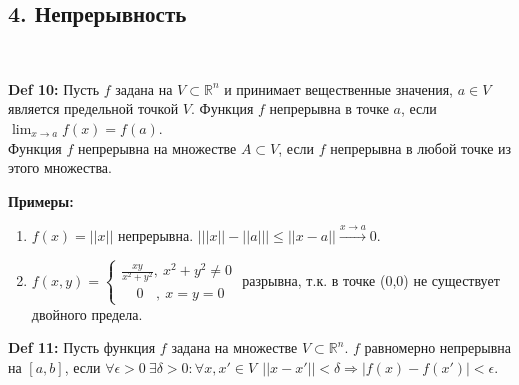 \documentclass[book, 11pt]{report}
\begin{document}
        \subsection*{4. Непрерывность}
        \par{\ }
        \par{\textbf{Def 10: }Пусть $f$ задана на $V\subset\mathbb{R}^n$ и принимает вещественные значения, $a\in V$ является предельной точкой $V$. Функция $f$ непрерывна в точке $a$, если $\displaystyle\lim_{x\to a}f(x)=f(a)$. \\
        Функция $f$ непрерывна на множестве $A\subset V$, если $f$ непрерывна в любой точке из этого множества.
        }
        \vspace{0.4cm}
        \par{\textbf{Примеры:}}
        \begin{enumerate}
            \item \par{$f(x)=||x||$ непрерывна. $\bigg|||x||-||a||\bigg|\leq||x-a||\xrightarrow{x\to a}0$.}
            \item \par{$f(x,y)=\begin{cases}
                \displaystyle\frac{xy}{x^2+y^2}, \ x^2+y^2\ne0 \\
                \ \ \ \ \ 0 \ \ \ \ , \ x=y=0
            \end{cases}$ разрывна, т.к. в точке (0,0) не существует двойного предела.}
        \end{enumerate}
        \newpage
        \par{\textbf{Def 11: }Пусть функция $f$ задана на множестве $V\subset\mathbb{R}^n$. $f$ равномерно непрерывна на $[a,b]$, если $\forall\epsilon>0 \ \exists\delta>0:\forall x,x'\in V \ \ ||x-x'||<\delta \Rightarrow |f(x)-f(x')|<\epsilon$.}
        \vspace{0.3cm}
\end{document}
